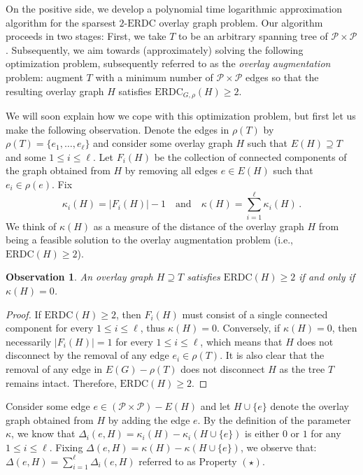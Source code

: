 \LongVersion \documentclass[11pt]{article}
\newtheorem*{observation*}{Observation}
\theoremstyle{definition}
\theoremstyle{plain}
\newcommand{\Edges}[0]{\mathit{E}}
\newcommand{\Peers}[0]{\mathcal{P}}
\newcommand{\ERDC}[0]{\mathrm{ERDC}}
\begin{document}
On the positive side, we develop a polynomial time logarithmic approximation
algorithm for the sparsest $2$-$\ERDC$ overlay graph problem.
Our algorithm proceeds in two stages:
First, we take $T$ to be an arbitrary spanning tree of $\Peers \times
\Peers$.
Subsequently, we aim towards (approximately) solving the following
optimization problem, subsequently referred to as the \emph{overlay
augmentation} problem:
augment $T$ with a minimum number of $\Peers \times \Peers$ edges so that
the resulting overlay graph $H$ satisfies $\ERDC_{G, \rho}(H) \geq 2$.

We will soon explain how we cope with this optimization problem, but first let
us make the following observation.
Denote the edges in $\rho(T)$ by $\rho(T) = \{ e_1, \dots, e_{\ell} \}$ and
consider some overlay graph $H$ such that $\Edges(H) \supseteq T$ and some $1
\leq i \leq \ell$.
Let $F_{i}(H)$ be the collection of connected components of the graph obtained
from $H$ by removing all edges $e \in \Edges(H)$ such that $e_i \in \rho(e)$.
Fix
$$
\kappa_{i}(H) = |F_{i}(H)| - 1
\quad \text{and} \quad
\kappa(H) = \sum_{i = 1}^{\ell}
\kappa_{i}(H) \, .
$$
We think of $\kappa(H)$ as a measure of the distance of the overlay graph
$H$ from being a feasible solution to the overlay augmentation problem (i.e.,
$\ERDC(H) \geq 2$).

\begin{observation*}
An overlay graph $H \supseteq T$ satisfies $\ERDC(H) \geq 2$ if and only if
$\kappa(H) = 0$.
\end{observation*}
\begin{proof}
If $\ERDC(H) \geq 2$, then $F_{i}(H)$ must consist of a single connected
component for every $1 \leq i \leq \ell$, thus $\kappa(H) = 0$.
Conversely, if $\kappa(H) = 0$, then necessarily $|F_{i}(H)| = 1$ for every $1
\leq i \leq \ell$, which means that $H$ does not disconnect by the removal of
any edge $e_i \in \rho(T)$.
It is also clear that the removal of any edge in $\Edges(G) - \rho(T)$ does
not disconnect $H$ as the tree $T$ remains intact.
Therefore, $\ERDC(H) \geq 2$.
\end{proof}

Consider some edge $e \in (\Peers \times \Peers) - \Edges(H)$ and let $H \cup
\{e\}$ denote the overlay graph obtained from $H$ by adding the edge $e$.
By the definition of the parameter $\kappa$, we know that
$
\Delta_{i}(e, H) = \kappa_{i}(H) - \kappa_{i}(H \cup \{e\})
$
is either $0$ or $1$ for any $1 \leq i \leq \ell$.
Fixing
$
\Delta(e, H) = \kappa(H) - \kappa(H \cup \{e\})
$,
we observe that:
$\Delta(e, H) = \sum_{i = 1}^{\ell} \Delta_{i}(e, H)$
referred to as Property $\mathbf{(\star)}$.
\end{document}
